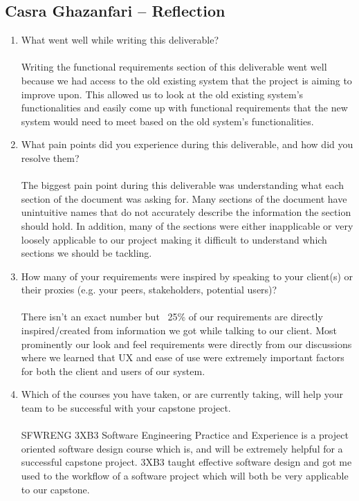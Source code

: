\documentclass[12pt]{article}
\begin{document}
\begin{enumerate}
\end{enumerate}

\subsection*{Casra Ghazanfari -- Reflection}

\begin{enumerate}
  \item What went well while writing this deliverable?\\\\
  Writing the functional requirements section of this deliverable went well 
  because we had access to the old existing system that the project is aiming 
  to improve upon. This allowed us to look at the old existing system’s functionalities 
  and easily come up with functional requirements that the new system would need to meet 
  based on the old system’s functionalities.
  \item What pain points did you experience during this deliverable, and how
  did you resolve them?\\\\
  The biggest pain point during this deliverable was understanding what each section 
  of the document was asking for. Many sections of the document have unintuitive names 
  that do not accurately describe the information the section should hold. In addition, many 
  of the sections were either inapplicable or very loosely applicable to our project making 
  it difficult to understand which sections we should be tackling.
  \item How many of your requirements were inspired by speaking to your
  client(s) or their proxies (e.g. your peers, stakeholders, potential users)?
  \\\\
  There isn’t an exact number but ~25\% of our requirements are directly inspired/created 
  from information we got while talking to our client. Most prominently our look and feel 
  requirements were directly from our discussions where we learned that UX and ease of use 
  were extremely important factors for both the client and users of our system.
  \item Which of the courses you have taken, or are currently taking, will help
  your team to be successful with your capstone project.\\\\
  SFWRENG 3XB3 Software Engineering Practice and Experience is a project oriented software 
  design course which is, and will be extremely helpful for a successful capstone project. 
  3XB3 taught effective software design and got me used to the workflow of a software project 
  which will both be very applicable to our capstone.
\end{enumerate}
\end{document}
